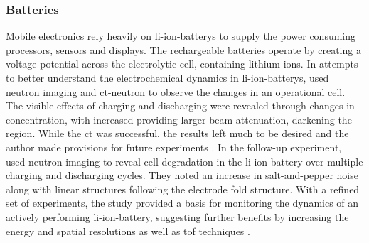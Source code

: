 \documentclass[../../../main.tex]{subfiles}%
\begin{document}
%
    \subsubsection{Batteries}%
    \label{sec:chapter-1:motivation:batteries}%
    Mobile electronics rely heavily on \glspl{li-ion-battery} to supply the power consuming processors, sensors and displays. 
    The rechargeable batteries operate by creating a voltage potential across the electrolytic cell, containing lithium ions. %
    In attempts to better understand the electrochemical dynamics in \glspl{li-ion-battery}, \citeauthor*{Butler_2011} used neutron imaging and \gls{ct-neutron} to observe the changes in an operational cell.
    The visible effects of charging and discharging were revealed through changes in  concentration, with increased  providing larger beam attenuation, darkening the region. 
    While the \gls{ct} was successful, the results left much to be desired and the author made provisions for future experiments \cite{Butler_2011}.    
    In the follow-up experiment, \citeauthor*{Butler_2013a} used neutron imaging to reveal cell degradation in the \gls{li-ion-battery} over multiple charging and discharging cycles.
    They noted an increase in salt-and-pepper noise along with linear structures following the electrode fold structure.
    With a refined set of experiments, the study provided a basis for monitoring the dynamics of an actively performing \gls{li-ion-battery}, suggesting further benefits by increasing the energy and spatial resolutions as well as \gls{tof} techniques \cite{Butler_2013a}.
\end{document}
